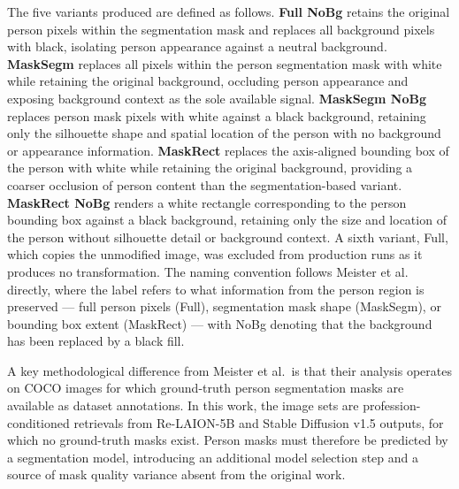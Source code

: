 The five variants produced are defined as follows. 
\textbf{Full NoBg} retains the original person pixels within 
the segmentation mask and replaces all background pixels with 
black, isolating person appearance against a neutral background. 
\textbf{MaskSegm} replaces all pixels within the person 
segmentation mask with white while retaining the original 
background, occluding person appearance and exposing background 
context as the sole available signal. \textbf{MaskSegm NoBg} 
replaces person mask pixels with white against a black 
background, retaining only the silhouette shape and spatial 
location of the person with no background or appearance 
information. \textbf{MaskRect} replaces the axis-aligned 
bounding box of the person with white while retaining the 
original background, providing a coarser occlusion of person 
content than the segmentation-based variant. \textbf{MaskRect 
	NoBg} renders a white rectangle corresponding to the person 
bounding box against a black background, retaining only the 
size and location of the person without silhouette detail or 
background context. A sixth variant, Full, which copies the 
unmodified image, was excluded from production runs as it 
produces no transformation. The naming convention follows 
Meister et al.\ \cite{Meister_2023_GenderArtifactsinVisualDatasets} 
directly, where the label refers to what information from the 
person region is preserved --- full person pixels (Full), 
segmentation mask shape (MaskSegm), or bounding box extent 
(MaskRect) --- with NoBg denoting that the background has been 
replaced by a black fill.

A key methodological difference from Meister et al.\ is that 
their analysis operates on COCO images for which ground-truth 
person segmentation masks are available as dataset annotations. 
In this work, the image sets are profession-conditioned 
retrievals from Re-LAION-5B and Stable Diffusion v1.5 outputs, 
for which no ground-truth masks exist. Person masks must 
therefore be predicted by a segmentation model, introducing an 
additional model selection step and a source of mask quality 
variance absent from the original work.

